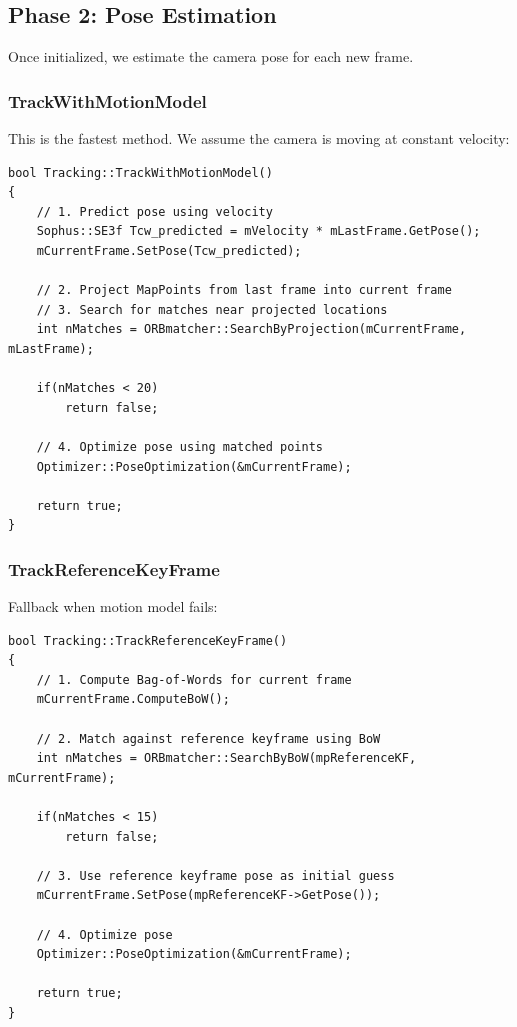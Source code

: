 \subsection{Phase 2: Pose Estimation}

Once initialized, we estimate the camera pose for each new frame.

\subsubsection{TrackWithMotionModel}

This is the fastest method. We assume the camera is moving at constant velocity:

\begin{lstlisting}[caption={TrackWithMotionModel concept}]
bool Tracking::TrackWithMotionModel()
{
    // 1. Predict pose using velocity
    Sophus::SE3f Tcw_predicted = mVelocity * mLastFrame.GetPose();
    mCurrentFrame.SetPose(Tcw_predicted);
    
    // 2. Project MapPoints from last frame into current frame
    // 3. Search for matches near projected locations
    int nMatches = ORBmatcher::SearchByProjection(mCurrentFrame, mLastFrame);
    
    if(nMatches < 20)
        return false;
    
    // 4. Optimize pose using matched points
    Optimizer::PoseOptimization(&mCurrentFrame);
    
    return true;
}
\end{lstlisting}

\subsubsection{TrackReferenceKeyFrame}

Fallback when motion model fails:

\begin{lstlisting}[caption={TrackReferenceKeyFrame concept}]
bool Tracking::TrackReferenceKeyFrame()
{
    // 1. Compute Bag-of-Words for current frame
    mCurrentFrame.ComputeBoW();
    
    // 2. Match against reference keyframe using BoW
    int nMatches = ORBmatcher::SearchByBoW(mpReferenceKF, mCurrentFrame);
    
    if(nMatches < 15)
        return false;
    
    // 3. Use reference keyframe pose as initial guess
    mCurrentFrame.SetPose(mpReferenceKF->GetPose());
    
    // 4. Optimize pose
    Optimizer::PoseOptimization(&mCurrentFrame);
    
    return true;
}
\end{lstlisting}

